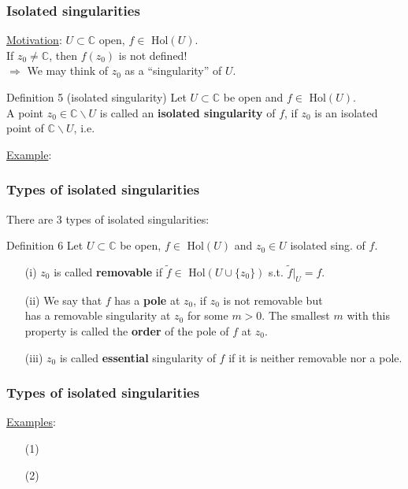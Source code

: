 \documentclass[10pt]{beamer}
\newcommand{\C}{\mathbb{C}}
\begin{document}
{\begin{frame}\frametitle{Isolated singularities}
\underline{Motivation}: $U \subset \C$ open, $f\in$ Hol$(U)$.\\
If $z_0 \neq \C$, then $f(z_0)$ is not defined!\\
$\Rightarrow$ We may think of $z_0$ as a ``singularity'' of $U$.
\vspace{0.2cm}
\begin{alertblock}{Definition 5 (isolated singularity)}
Let $U \subset \C$ be open and $f\in$ Hol$(U)$.\\
A point $z_0\in \C\backslash U$ is called an \textbf{isolated singularity} of $f$, if $z_0$ is an isolated point of $ \C\backslash U$, i.e.\\
\vspace{1cm}
\end{alertblock}
\vspace{0.2cm}
\underline{Example}: \vspace{2cm}
\end{frame}

\begin{frame}\frametitle{Types of isolated singularities}
There are 3 types of isolated singularities:
\vspace{0.2cm}
\begin{alertblock}{Definition 6}
Let $U \subset \C$ be open, $f\in$ Hol$(U)$ and $z_0\in U$ isolated sing. of $f$.\\
\begin{itemize}
\item[(i)] $z_0$ is called \textbf{removable} if $\tilde{f}\in$ Hol$(U \cup \{z_0\})$ s.t. $\tilde{f}|_U=f$.
\item[(ii)] We say that $f$ has a \textbf{pole} at $z_0$, if $z_0$ is not removable but
$$\;$$
has a removable singularity at $z_0$ for some $m>0$. The smallest $m$ with this property is called the \textbf{order} of the pole of $f$ at $z_0$.
\item[(iii)] $z_0$ is called \textbf{essential} singularity of $f$ if it is neither removable nor a pole.
\end{itemize}
\end{alertblock}
\end{frame}

\begin{frame}\frametitle{Types of isolated singularities}
\underline{Examples}:\\
 \vspace{0.2cm}
\begin{itemize}
\item[(1)] \;\\ \vspace{1cm}
\item[(2)] \;\\ \vspace{4cm}
\end{itemize}
\end{frame}

}
\end{document}
